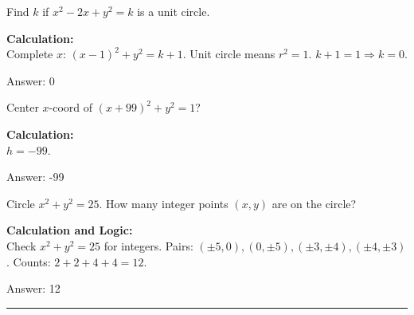 \documentclass[11pt,paper=a4,answers]{exam}
\begin{document}
\begin{questions}
\question
Find $k$ if $x^2 - 2x + y^2 = k$ is a unit circle.

\begin{solution}
\textbf{Calculation:} \\
Complete $x$: $(x-1)^2 + y^2 = k + 1$. Unit circle means $r^2 = 1$. $k + 1 = 1 \Rightarrow k = 0$.

\vspace{30pt}

Answer: \colorbox{yellow!100}{0}
\end{solution}

\vspace{60pt}

\question
Center $x$-coord of $(x+99)^2 + y^2 = 1$?

\begin{solution}
\textbf{Calculation:} \\
$h = -99$.

\vspace{30pt}

Answer: \colorbox{yellow!100}{-99}
\end{solution}

\vspace{60pt}

\question
Circle $x^2 + y^2 = 25$. How many integer points $(x, y)$ are on the circle?

\begin{solution}
\textbf{Calculation and Logic:} \\
Check $x^2+y^2=25$ for integers. Pairs: $(\pm 5, 0), (0, \pm 5), (\pm 3, \pm 4), (\pm 4, \pm 3)$. Counts: $2 + 2 + 4 + 4 = 12$.

\vspace{30pt}

Answer: \colorbox{yellow!100}{12}
\end{solution}



\end{questions}
\begin{center}
\rule{.5\textwidth}{1pt}
\end{center}
\end{document}
